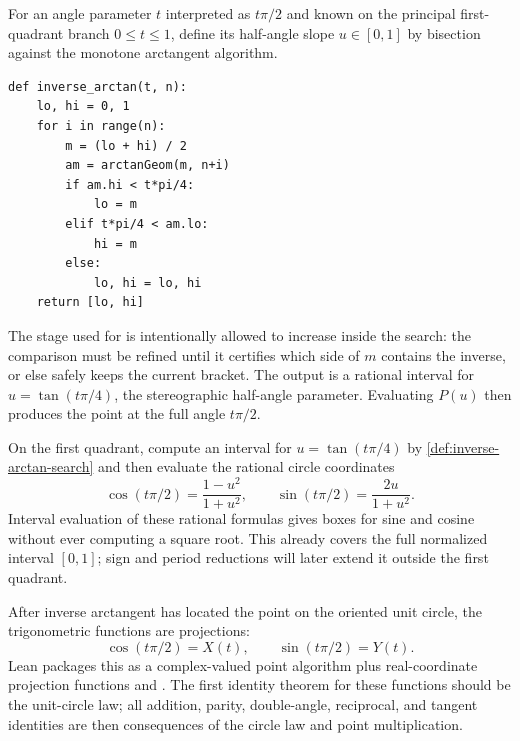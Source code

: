 \begin{definition}
\label{def:inverse-arctan-search}
For an angle parameter \(t\) interpreted as \(t\pi/2\) and known on the
principal first-quadrant branch \(0\le t\le 1\), define its half-angle slope
\(u\in[0,1]\) by bisection against the monotone arctangent algorithm.
\begin{verbatim}
def inverse_arctan(t, n):
    lo, hi = 0, 1
    for i in range(n):
        m = (lo + hi) / 2
        am = arctanGeom(m, n+i)
        if am.hi < t*pi/4:
            lo = m
        elif t*pi/4 < am.lo:
            hi = m
        else:
            lo, hi = lo, hi
    return [lo, hi]
\end{verbatim}
The stage used for  is intentionally allowed to
increase inside the search: the comparison must be refined until it certifies
which side of \(m\) contains the inverse, or else safely keeps the current
bracket.  The output is a rational interval for \(u=\tan(t\pi/4)\), the
stereographic half-angle parameter.  Evaluating \(P(u)\) then produces the
point at the full angle \(t\pi/2\).
\end{definition}

\begin{definition}
\label{def:sin-cos-from-inverse-arctan}
On the first quadrant, compute an interval for \(u=\tan(t\pi/4)\) by
\cref{def:inverse-arctan-search} and then evaluate the rational circle
coordinates
\[
  \cos(t\pi/2)=\frac{1-u^2}{1+u^2},
  \qquad
  \sin(t\pi/2)=\frac{2u}{1+u^2}.
\]
Interval evaluation of these rational formulas gives boxes for sine and
cosine without ever computing a square root.  This already covers the full
normalized interval \([0,1]\); sign and period reductions will later extend
it outside the first quadrant.
\end{definition}

\begin{definition}
\label{def:sin-cos-from-circle-point}
After inverse arctangent has located the point on the oriented unit circle, the
trigonometric functions are projections:
\[
  \cos(t\pi/2)=X(t),\qquad \sin(t\pi/2)=Y(t).
\]
Lean packages this as a complex-valued point algorithm plus real-coordinate
projection functions  and
.  The first identity theorem for these functions
should be the unit-circle law; all addition, parity, double-angle, reciprocal,
and tangent identities are then consequences of the circle law and point
multiplication.
\end{definition}

